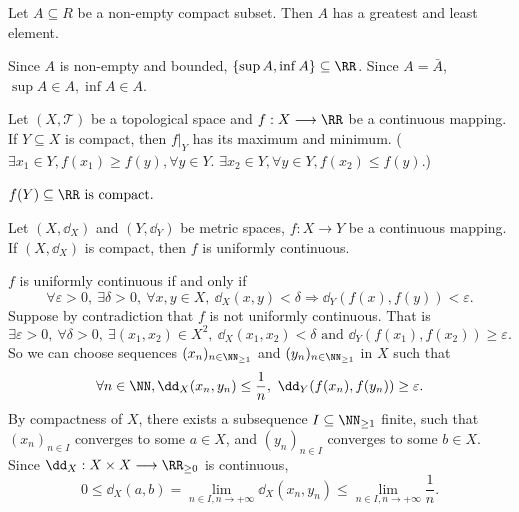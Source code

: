 \begin{lemmaenv}
    Let $A\subseteq R$ be a non-empty compact subset. Then $A$ has a greatest and least element.
\end{lemmaenv}
\begin{proofenv}
    Since $A$ is non-empty and bounded, $\{\sup A,\inf A\}\subseteq \RR$. Since $A=\bar{A}$, $\sup A\in A, \inf A\in A$.
\end{proofenv}
\begin{theoremenv}
    Let $(X,\mathscr{T})$ be a topological space and $f:X\longrightarrow \RR$ be a continuous mapping. If $Y\subseteq X$ is compact, then $f|_Y$ has its maximum and minimum. ($\exists x_1\in Y, f(x_1)\ge f(y), \forall y\in Y$. $\exists x_2\in Y,\forall y\in Y, f(x_2)\le f(y)$.)
\end{theoremenv}
\begin{proofenv}
    $f(Y)\subseteq \RR\text{ is compact.}$
\end{proofenv}
\begin{theoremenv}
    Let $(X,\dd_X)$ and $(Y,\dd_Y)$ be metric spaces, $f:X\longrightarrow Y$ be a continuous mapping. If $(X,\dd_X)$ is compact, then $f$ is uniformly continuous.
\end{theoremenv}
\begin{proofenv}
    $f$ is uniformly continuous if and only if 
    $$\forall \varepsilon>0,\ \exists \delta>0,\ \forall x,y\in X,\ \dd_X(x,y)<\delta \Rightarrow \dd_Y(f(x),f(y))<\varepsilon.$$
    Suppose by contradiction that $f$ is not uniformly continuous. That is 
    $$\exists \varepsilon>0,\ \forall \delta>0,\ \exists (x_1,x_2)\in X^2,\ \dd_X(x_1,x_2)<\delta \text{ and } \dd_Y(f(x_1),f(x_2))\ge \varepsilon.$$
    So we can choose sequences $(x_n)_{n\in \NN_{\ge1}}$ and $(y_n)_{n\in \NN_{\ge1}}$ in $X$ such that
    $$\forall n\in \NN, \dd_{X}(x_n,y_n)\le \frac{1}{n},\ \dd_Y(f(x_n),f(y_n))\ge \varepsilon.$$
    By compactness of $X$, there exists a subsequence $I\subseteq \NN_{\ge 1}$ finite, such that $(x_n)_{n\in I}$ converges to some $a\in X$, and $(y_n)_{n\in I}$ converges to some $b\in X$. Since $\dd_X:X\times X\longrightarrow \RR_{\ge 0}$ is continuous, 
    $$0\le \dd_{X}(a,b)=\lim_{n\in I,n\rightarrow+\infty}\dd_{X}(x_n,y_n)\le \lim_{n\in I,n\rightarrow+\infty}\frac{1}{n}.$$
\end{proofenv}

\newpage
